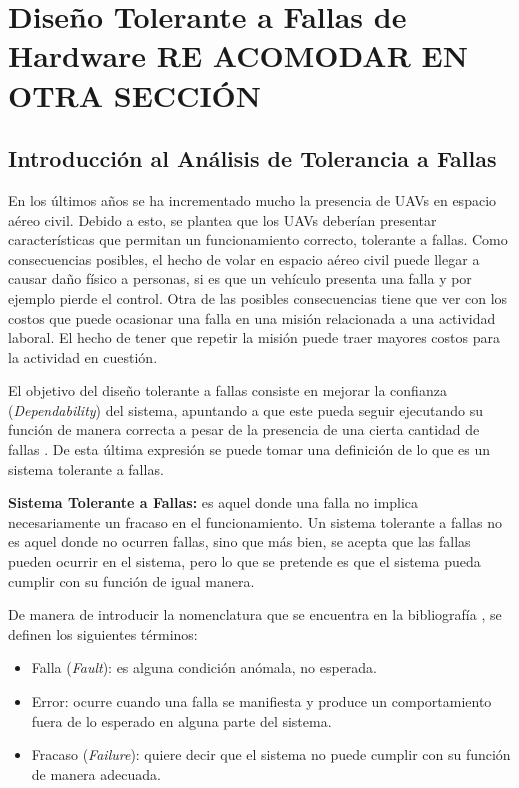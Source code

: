 \section*{Diseño Tolerante a Fallas de Hardware RE ACOMODAR EN OTRA SECCIÓN}

\subsection*{Introducción al Análisis de Tolerancia a Fallas}\label{subsec:introduccion_al_analisis_de_tolerancia_a_fallas}

En los últimos años se ha incrementado mucho la presencia de UAVs en espacio aéreo civil. Debido a esto, se plantea que los UAVs deberían presentar características que permitan un funcionamiento correcto, tolerante a fallas. Como consecuencias posibles, el hecho de volar en espacio aéreo civil puede llegar a causar daño físico a personas, si es que un vehículo presenta una falla y por ejemplo pierde el control. Otra de las posibles consecuencias tiene que ver con los costos que puede ocasionar una falla en una misión relacionada a una actividad laboral. El hecho de tener que repetir la misión puede traer mayores costos para la actividad en cuestión.

El objetivo del diseño tolerante a fallas consiste en mejorar la confianza (\textit{Dependability}) del sistema, apuntando a que este pueda seguir ejecutando su función de manera correcta a pesar de la presencia de una cierta cantidad de fallas \cite{nelson1990fault}. De esta última expresión se puede tomar una definición de lo que es un sistema tolerante a fallas.

\begin{mydef}
    \textbf{Sistema Tolerante a Fallas:} es aquel donde una falla no implica necesariamente un fracaso en el funcionamiento. Un sistema tolerante a fallas no es aquel donde no ocurren fallas, sino que más bien, se acepta que las fallas pueden ocurrir en el sistema, pero lo que se pretende es que el sistema pueda cumplir con su función de igual manera.
\end{mydef}

De manera de introducir la nomenclatura que se encuentra en la bibliografía \cite{nelson1990fault}, se definen los siguientes términos:

\begin{itemize}
    \item Falla (\textit{Fault}): es alguna condición anómala, no esperada.
    \item Error: ocurre cuando una falla se manifiesta y produce un comportamiento fuera de lo esperado en alguna parte del sistema.
    \item Fracaso (\textit{Failure}): quiere decir que el sistema no puede cumplir con su función de manera adecuada.
\end{itemize}

